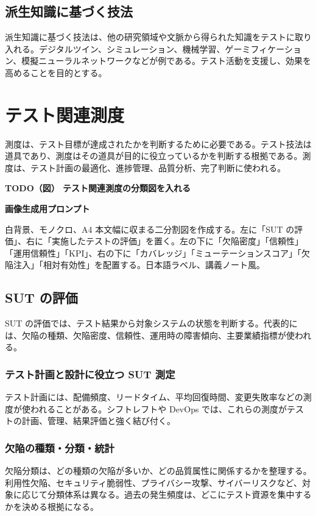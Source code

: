\documentclass[uplatex,dvipdfmx,a4paper,11pt,nomag]{jsarticle}
\newenvironment{todobox}[2]{\par\medskip\begin{framed}\noindent\textbf{TODO（図） #1}\par\smallskip\noindent\textbf{画像生成用プロンプト}\par\smallskip\noindent #2\par\smallskip}{\end{framed}\par\medskip}
\begin{document}
\subsection{派生知識に基づく技法}
派生知識に基づく技法は、他の研究領域や文脈から得られた知識をテストに取り入れる。デジタルツイン、シミュレーション、機械学習、ゲーミフィケーション、模擬ニューラルネットワークなどが例である。テスト活動を支援し、効果を高めることを目的とする。

\section{テスト関連測度}
測度は、テスト目標が達成されたかを判断するために必要である。テスト技法は道具であり、測度はその道具が目的に役立っているかを判断する根拠である。測度は、テスト計画の最適化、進捗管理、品質分析、完了判断に使われる。

\begin{todobox}{テスト関連測度の分類図を入れる}{白背景、モノクロ、A4 本文幅に収まる二分割図を作成する。左に「SUT の評価」、右に「実施したテストの評価」を置く。左の下に「欠陥密度」「信頼性」「運用信頼性」「KPI」、右の下に「カバレッジ」「ミューテーションスコア」「欠陥注入」「相対有効性」を配置する。日本語ラベル、講義ノート風。}
\end{todobox}

\subsection{SUT の評価}
SUT の評価では、テスト結果から対象システムの状態を判断する。代表的には、欠陥の種類、欠陥密度、信頼性、運用時の障害傾向、主要業績指標が使われる。

\subsubsection{テスト計画と設計に役立つ SUT 測定}
テスト計画には、配備頻度、リードタイム、平均回復時間、変更失敗率などの測度が使われることがある。シフトレフトや DevOps では、これらの測度がテストの計画、管理、結果評価と強く結び付く。

\subsubsection{欠陥の種類・分類・統計}
欠陥分類は、どの種類の欠陥が多いか、どの品質属性に関係するかを整理する。利用性欠陥、セキュリティ脆弱性、プライバシー攻撃、サイバーリスクなど、対象に応じて分類体系は異なる。過去の発生頻度は、どこにテスト資源を集中するかを決める根拠になる。
\end{document}

